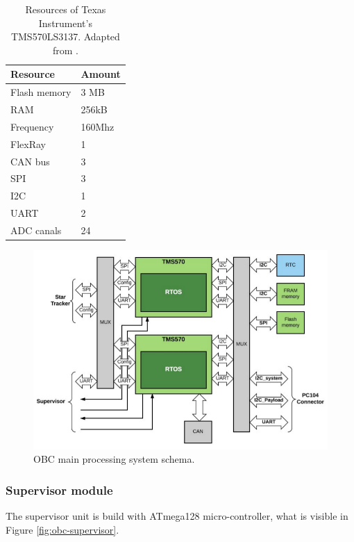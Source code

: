\documentclass[12pt,a4paper,oneside]{article}
\begin{document}
\begin{table}[!htbp]
\centering
\begin{tabular}{|p{4cm}|p{3cm}|}\hline 
\textbf{Resource} & \textbf{Amount} \\ 
\hline 
Flash memory & 3 MB \\ 
\hline 
RAM & 256kB \\ 
\hline 
Frequency & 160Mhz \\ 
\hline 
FlexRay & 1 \\ 
\hline 
CAN bus & 3 \\ 
\hline 
SPI & 3 \\ 
\hline 
I2C & 1 \\ 
\hline 
UART & 2 \\ 
\hline 
ADC canals & 24 \\ 
\hline 
\end{tabular} 
\caption{Resources of Texas Instrument's TMS570LS3137. Adapted from \citet{gaska2016obc}.}
\label{tab:obc-main-processor}
\end{table}


\begin{figure}[!htbp]
\includegraphics[scale=0.49]{obc_main_processor.png}
\centering
\caption{OBC main processing system schema\cite{gaska2016obc}.}
\label{fig:obc-main-processor}
\end{figure}


\subsubsection{Supervisor module} 

The supervisor unit is build with ATmega128 micro-controller, what is visible in Figure \ref{fig:obc-supervisor}.
\end{document}
